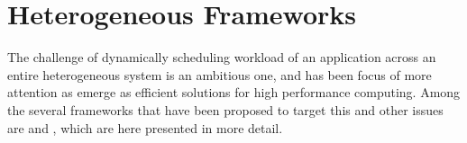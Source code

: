 \documentclass[main.tex]{subfiles}
\begin{document}
\chapter{Heterogeneous Frameworks}

The challenge of dynamically scheduling workload of an application across an entire heterogeneous system is an ambitious one, and has been focus of more attention as \hetplats emerge as efficient solutions for high performance computing. Among the several frameworks that have been proposed to target this and other issues are \gama and \starpu, which are here presented in more detail.




\end{document}
